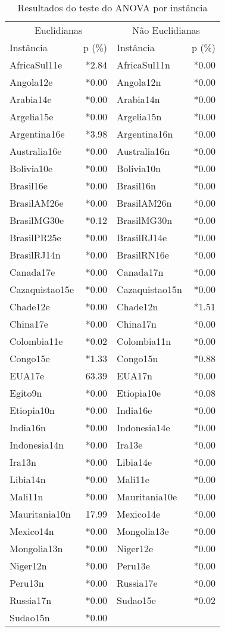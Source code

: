 \begin{table}[htb]
\caption{Resultados do teste do ANOVA por instância}
\label{tab:resultados_anova}
\begin{tabular}{@{}lr|lr@{}}
\toprule
\multicolumn{2}{c|}{Euclidianas}&\multicolumn{2}{|c}{Não Euclidianas}\\Inst\^ancia&p (\%)&Inst\^ancia&p (\%)\\\midrule
AfricaSul11e&*2.84&AfricaSul11n&*0.00\\
Angola12e&*0.00&Angola12n&*0.00\\
Arabia14e&*0.00&Arabia14n&*0.00\\
Argelia15e&*0.00&Argelia15n&*0.00\\
Argentina16e&*3.98&Argentina16n&*0.00\\
Australia16e&*0.00&Australia16n&*0.00\\
Bolivia10e&*0.00&Bolivia10n&*0.00\\
Brasil16e&*0.00&Brasil16n&*0.00\\
BrasilAM26e&*0.00&BrasilAM26n&*0.00\\
BrasilMG30e&*0.12&BrasilMG30n&*0.00\\
BrasilPR25e&*0.00&BrasilRJ14e&*0.00\\
BrasilRJ14n&*0.00&BrasilRN16e&*0.00\\
Canada17e&*0.00&Canada17n&*0.00\\
Cazaquistao15e&*0.00&Cazaquistao15n&*0.00\\
Chade12e&*0.00&Chade12n&*1.51\\
China17e&*0.00&China17n&*0.00\\
Colombia11e&*0.02&Colombia11n&*0.00\\
Congo15e&*1.33&Congo15n&*0.88\\
EUA17e&63.39&EUA17n&*0.00\\
Egito9n&*0.00&Etiopia10e&*0.08\\
Etiopia10n&*0.00&India16e&*0.00\\
India16n&*0.00&Indonesia14e&*0.00\\
Indonesia14n&*0.00&Ira13e&*0.00\\
Ira13n&*0.00&Libia14e&*0.00\\
Libia14n&*0.00&Mali11e&*0.00\\
Mali11n&*0.00&Mauritania10e&*0.00\\
Mauritania10n&17.99&Mexico14e&*0.00\\
Mexico14n&*0.00&Mongolia13e&*0.00\\
Mongolia13n&*0.00&Niger12e&*0.00\\
Niger12n&*0.00&Peru13e&*0.00\\
Peru13n&*0.00&Russia17e&*0.00\\
Russia17n&*0.00&Sudao15e&*0.02\\
Sudao15n&*0.00&\bottomrule
\end{tabular}
\end{table}
